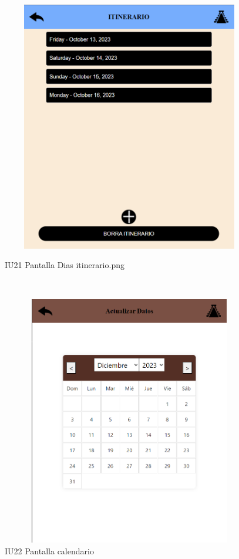 \begin{figure}[htb]
        \begin{minipage}{1\textwidth}
        \centering
        \includegraphics[width=17cm, height=11cm]{front/PANTALLAS FUNCIONALES 3 DICIEMBRE/IU21_Pantalla Dias itinerario.png}
        \caption{IU21 Pantalla Dias itinerario.png}
    \end{minipage}%
    \\
        \begin{minipage}{1\textwidth}
        \centering
        \includegraphics[width=17cm, height=11cm]{front/PANTALLAS FUNCIONALES 3 DICIEMBRE/IU22_Pantalla calendario.png}
        \caption{IU22 Pantalla calendario}
    \end{minipage}%
\end{figure}


